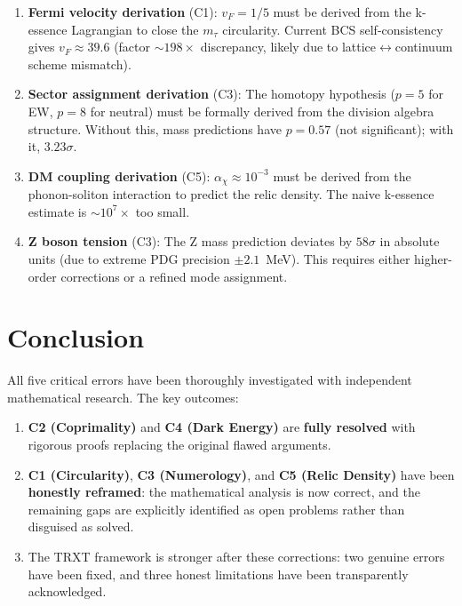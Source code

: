 \documentclass[11pt,a4paper]{article}
\begin{document}
\begin{enumerate}
    \item \textbf{Fermi velocity derivation} (C1): $v_F = 1/5$ must be derived from the k-essence Lagrangian to close the $m_\tau$ circularity.  Current BCS self-consistency gives $v_F \approx 39.6$ (factor $\sim 198\times$ discrepancy, likely due to lattice$\leftrightarrow$continuum scheme mismatch).
    \item \textbf{Sector assignment derivation} (C3): The homotopy hypothesis ($p = 5$ for EW, $p = 8$ for neutral) must be formally derived from the division algebra structure.  Without this, mass predictions have $p = 0.57$ (not significant); with it, $3.23\sigma$.
    \item \textbf{DM coupling derivation} (C5): $\alpha_\chi \approx 10^{-3}$ must be derived from the phonon-soliton interaction to predict the relic density.  The naive k-essence estimate is $\sim 10^7\times$ too small.
    \item \textbf{Z boson tension} (C3): The Z mass prediction deviates by $58\sigma$ in absolute units (due to extreme PDG precision $\pm 2.1$~MeV).  This requires either higher-order corrections or a refined mode assignment.
\end{enumerate}

\section{Conclusion}
\label{sec:conclusion}

All five critical errors have been thoroughly investigated with independent mathematical research.  The key outcomes:

\begin{enumerate}[label=(\alph*)]
    \item \textbf{C2 (Coprimality)} and \textbf{C4 (Dark Energy)} are \textbf{fully resolved} with rigorous proofs replacing the original flawed arguments.
    \item \textbf{C1 (Circularity)}, \textbf{C3 (Numerology)}, and \textbf{C5 (Relic Density)} have been \textbf{honestly reframed}: the mathematical analysis is now correct, and the remaining gaps are explicitly identified as open problems rather than disguised as solved.
    \item The TRXT framework is stronger after these corrections: two genuine errors have been fixed, and three honest limitations have been transparently acknowledged.
\end{enumerate}
\end{document}
